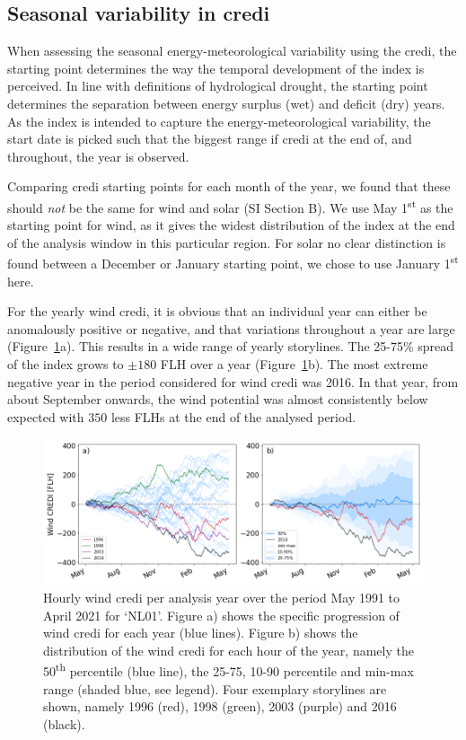 \documentclass[a4paper,11pt]{extarticle}
\newcommand{\ts}[1]{\textsuperscript{#1}}
\newcommand{\credi}[0]{{\sc credi}}
\newcommand{\wdi}[0]{{\sc wind credi}}
\begin{document}

\subsection{Seasonal variability in \credi}\label{sc:seasonal}
When assessing the seasonal energy-meteorological variability using the \credi, the starting point determines the way the temporal development of the index is perceived. 
In line with definitions of hydrological drought, the starting point determines the separation between energy surplus (wet) and deficit (dry) years. 
As the index is intended to capture the energy-meteorological variability, the start date is picked such that the biggest range if \credi{} at the end of, and throughout, the year is observed. 

Comparing \credi{} starting points for each month of the year, we found that these should \emph{not} be the same for wind and solar (SI Section B). 
We use May 1\ts{st} as the starting point for wind, as it gives the widest distribution of the index at the end of the analysis window in this particular region.  
For solar no clear distinction is found between a December or January starting point, we chose to use January 1\ts{st} here.

For the yearly \wdi, it is obvious that an individual year can either be anomalously positive or negative, and that variations throughout a year are large (Figure~\ref{fig:analysis_seasonal_wind}a). 
This results in a wide range of yearly storylines. 
The 25-75\% spread of the index grows to $\pm180$ FLH over a year (Figure~\ref{fig:analysis_seasonal_wind}b). 
The most extreme negative year in the period considered for \wdi{} was 2016. 
In that year, from about September onwards, the wind potential was almost consistently below expected with $350$ less FLHs at the end of the analysed period.

\begin{figure}[hb]
        \centering
        \includegraphics[width=\textwidth]{WindCREDI_annual}    
        \caption{
                Hourly \wdi{} per analysis year over the period May 1991 to April 2021 for `NL01'. 
                Figure a) shows the specific progression of \wdi{} for each year (blue lines). 
                Figure b) shows the distribution of the \wdi{} for each hour of the year, namely the 50\ts{th} percentile (blue line), the 25-75, 10-90 percentile and min-max range (shaded blue, see legend). 
                Four exemplary storylines are shown, namely 1996 (red), 1998 (green), 2003 (purple) and 2016 (black).
        }
        \label{fig:analysis_seasonal_wind}
\end{figure}
\end{document}
